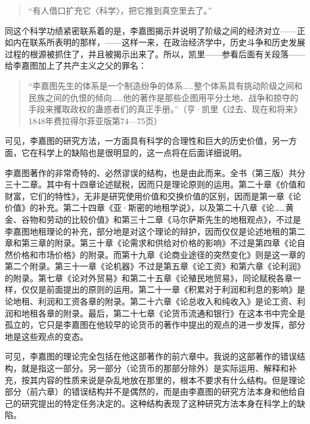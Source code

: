 \begin{quote}{“有人借口扩充它〈科学〉，把它推到真空里去了。”}\end{quote}

同这个科学功绩紧密联系着的是，李嘉图揭示并说明了阶级之间的经济对立——正如内在联系所表明的那样，——这样一来，在政治经济学中，历史斗争和历史发展过程的根源被抓住了，并且被揭示出来了。所以，凯里——参看后面有关段落——给李嘉图加上了共产主义之父的罪名：

\begin{quote}{“李嘉图先生的体系是一个制造纷争的体系……整个体系具有挑动阶级之间和民族之间的仇恨的倾向……他的著作是那些企图用平分土地、战争和掠夺的手段来攫取政权的蛊惑者们的真正手册。”（亨·凯里《过去、现在和将来》1848年费拉得尔菲亚版第74—75页）}\end{quote}

可见，李嘉图的研究方法，一方面具有科学的合理性和巨大的历史价值，另一方面，它在科学上的缺陷也是很明显的，这一点将在后面详细说明。

李嘉图著作的非常奇特的、必然谬误的结构，也是由此而来。全书（第三版）共分三十二章。其中有十四章论述赋税，因而只是理论原则的运用。第二十章《价值和财富，它们的特性》，无非是研究使用价值和交换价值的区别，因而是第一章《论价值》的补充。第二十四章《亚·斯密的地租学说》，以及第二十八章《论……黄金、谷物和劳动的比较价值》和第三十二章《马尔萨斯先生的地租观点》，不过是李嘉图地租理论的补充，部分地是对这个理论的辩护，因而仅仅是论述地租的第二章和第三章的附录。第三十章《论需求和供给对价格的影响》不过是第四章《论自然价格和市场价格》的附录。而第十九章《论商业途径的突然变化》则是这一章的第二个附录。第三十一章《论机器》不过是第五章《论工资》和第六章《论利润》的附录。第七章《论对外贸易》和第二十五章《论殖民地贸易》，同论赋税各章一样，仅仅是前面提出的原则的运用。第二十一章《积累对于利润和利息的影响》是论地租、利润和工资各章的附录。第二十六章《论总收入和纯收入》是论工资、利润和地租各章的附录。最后，第二十七章《论货币流通和银行》在这本书中完全是孤立的，它只是李嘉图在他较早的论货币的著作中提出的观点的进一步发挥，部分地是这些观点的变态。

可见，李嘉图的理论完全包括在他这部著作的前六章中。我说的这部著作的错误结构，就是指这一部分。另一部分（论货币的那部分除外）是实际运用、解释和补充，按其内容的性质来说是杂乱地放在那里的，根本不要求有什么结构。但是理论部分（前六章）的错误结构并不是偶然的，而是由李嘉图的研究方法本身和他给自己的研究提出的特定任务决定的。这种结构表现了这种研究方法本身在科学上的缺陷。

